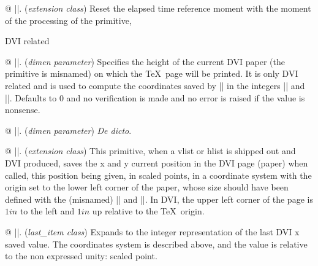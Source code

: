 
@ |\resettimer|. ({\sl extension class})\enskip
Reset the elapsed time reference moment with the moment of the
processing of the primitive,


\enddiv %

\begindiv DVI related

@ |\pageheight|. ({\sl dimen parameter})\enskip
Specifies the height of the current DVI paper (the primitive is
misnamed) on which the \TeX\ page will be printed. It is only
DVI related and is used to compute the coordinates saved by |\savepos|
in the integers |\lastxpos| and |\lastypos|. Defaults to $0$ and
no verification is made and no error is raised if the value is
nonsense.
 
@ |\pagewidth|. ({\sl dimen parameter})\enskip
{\it De dicto}.

@ |\savepos|. ({\sl extension class})\enskip
This primitive, when a vlist or hlist is shipped out and DVI produced,
saves the x and y current position in the DVI page (paper) when called,
this position being given, in scaled points, in a coordinate system
with the origin set to the lower left corner of the paper, whose
size should have been defined with the (misnamed) |\pagewidth| and
|\pageheight|. In DVI, the upper left corner of the page is $1in$
to the left and $1in$ up relative to the \TeX\ origin.


@ |\lastxpos|. ({\sl last\_item class})\enskip
Expands to the integer representation of the last DVI x saved value. The
coordinates system is described above, and the value is relative to the
non expressed unity: scaled point.

